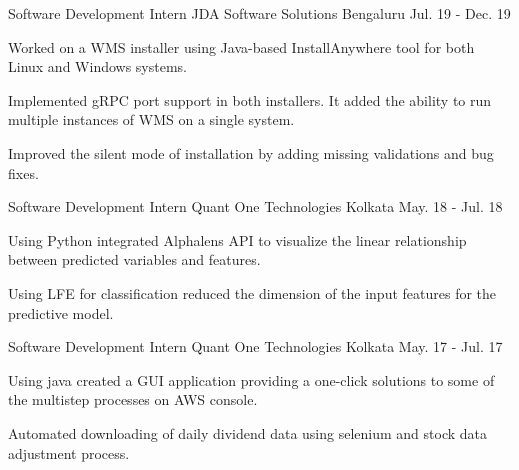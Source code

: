 

\begin{cventries}

  \cventry
    {Software Development Intern} %
    {JDA Software Solutions} %
    {Bengaluru} %
    {Jul. 19 - Dec. 19} %
    {
      \begin{cvitems}
        \item{Worked on a WMS installer using Java-based InstallAnywhere tool for both Linux
         and Windows systems.}
        \item{Implemented gRPC port support in both installers.
         It added the ability to run multiple instances of WMS on a single system.}
        \item{Improved the silent mode of installation by adding missing validations and bug fixes.}
      \end{cvitems}
    }

  \cventry
    {Software Development Intern} %
    {Quant One Technologies} %
    {Kolkata} %
    {May. 18 - Jul. 18} %
    {
      \begin{cvitems}
        \item {Using Python integrated Alphalens API to visualize the linear relationship
         between predicted variables and features.}
        \item {Using LFE for classification reduced the dimension of the input
         features for the predictive model.}
      \end{cvitems}
    }

  \cventry
    {Software Development Intern} %
    {Quant One Technologies} %
    {Kolkata} %
    {May. 17 - Jul. 17} %
    {
      \begin{cvitems}
        \item {Using java created a GUI application providing a
         one-click solutions to some of the multistep processes on AWS console.}
        \item {Automated downloading of daily dividend data using selenium
         and stock data adjustment process.}
      \end{cvitems}
    }

\end{cventries}

